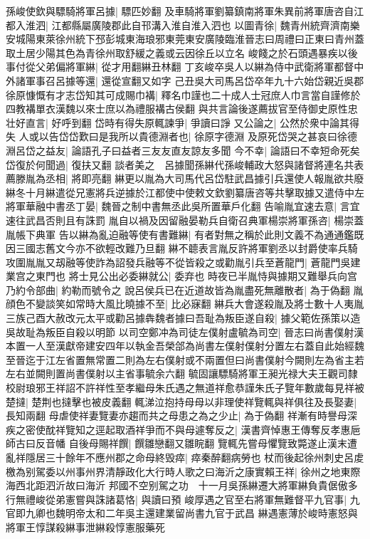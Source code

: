孫峻使欽與驃騎將軍呂據|{
	驃匹妙翻}
及車騎將軍劉纂鎮南將軍朱異前將軍唐咨自江都入淮泗|{
	江都縣屬廣陵郡此自邗溝入淮自淮入泗也}
以圖青徐|{
	魏青州統齊濟南樂安城陽東萊徐州統下邳彭城東海琅邪東莞東安廣陵臨淮晉志曰周禮曰正東曰青州蓋取土居少陽其色為青徐州取舒緩之義或云因徐丘以立名}
峻餞之於石頭遇暴疾以後事付從父弟偏將軍綝|{
	從才用翻綝丑林翻}
丁亥峻卒吳人以綝為侍中武衛將軍都督中外諸軍事召呂據等還|{
	還從宣翻又如字}
己丑吳大司馬呂岱卒年九十六始岱親近吳郡徐原慷慨有才志岱知其可成賜巾褠|{
	釋名巾謹也二十成人士冠庶人巾言當自謹修於四教褠單衣漢魏以來士庶以為禮服褠古侯翻}
與共言論後遂薦拔官至侍御史原性忠壮好直言|{
	好呼到翻}
岱時有得失原輒諫爭|{
	爭讀曰諍}
又公論之|{
	公然於衆中論其得失}
人或以告岱岱歎曰是我所以貴德淵者也|{
	徐原字德淵}
及原死岱哭之甚哀曰徐德淵呂岱之益友|{
	論語孔子曰益者三友友直友諒友多聞}
今不幸|{
	論語曰不幸短命死矣}
岱復於何聞過|{
	復扶又翻}
談者美之　呂據聞孫綝代孫峻輔政大怒與諸督將連名共表薦滕胤為丞相|{
	將即亮翻}
綝更以胤為大司馬代呂岱駐武昌據引兵還使人報胤欲共廢綝冬十月綝遣從兄憲將兵逆據於江都使中使敕文欽劉纂唐咨等共擊取據又遣侍中左將軍華融中書丞丁晏|{
	魏晉之制中書無丞此吳所置華戶化翻}
告喻胤宜速去意|{
	言宜速往武昌否則且有誅罰}
胤自以禍及因留融晏勒兵自衛召典軍楊崇將軍孫咨|{
	楊崇蓋胤帳下典軍}
告以綝為亂迫融等使有書難綝|{
	有者對無之稱於此則文義不為通通鑑既因三國志舊文今亦不欲輕改難乃旦翻}
綝不聼表言胤反許將軍劉丞以封爵使率兵騎攻圍胤胤又刼融等使詐為詔發兵融等不從皆殺之或勸胤引兵至蒼龍門|{
	蒼龍門吳建業宫之東門也}
將士見公出必委綝就公|{
	委弃也}
時夜已半胤恃與據期又難舉兵向宫乃約令部曲|{
	約勒而號令之}
說呂侯兵已在近道故皆為胤盡死無離散者|{
	為于偽翻}
胤顔色不變談笑如常時大風比曉據不至|{
	比必寐翻}
綝兵大會遂殺胤及將士數十人夷胤三族己酉大赦改元太平或勸呂據犇魏者據曰吾耻為叛臣遂自殺|{
	據父範佐孫策以造吳故耻為叛臣自殺以明節}
以司空鄭冲為司徒左僕射盧毓為司空|{
	晉志曰尚書僕射漢本置一人至漢獻帝建安四年以執金吾榮郃為尚書左僕射僕射分置左右蓋自此始經魏至晉迄于江左省置無常置二則為左右僕射或不兩置但曰尚書僕射今闕則左為省主若左右並闕則置尚書僕射以主省事毓余六翻}
毓固讓驃騎將軍王昶光禄大夫王觀司隸校尉琅邪王祥詔不許祥性至孝繼母朱氏遇之無道祥愈恭謹朱氏子覽年數歲每見祥被楚撻|{
	楚荆也撻擊也被皮義翻}
輒涕泣抱持母母以非理使祥覽輒與祥俱往及長娶妻|{
	長知兩翻}
母虐使祥妻覽妻亦趨而共之母患之為之少止|{
	為于偽翻}
祥漸有時譽母深疾之密使酖祥覽知之逕起取酒祥爭而不與母遽奪反之|{
	漢書齊悼惠王傳奪反孝惠巵師古曰反音幡}
自後母賜祥饌|{
	饌雛戀翻又雛睆翻}
覽輒先嘗母懼覽致斃遂止漢末遭亂祥隱居三十餘年不應州郡之命母終毁瘁|{
	瘁秦醉翻病勞也}
杖而後起徐州刺史呂䖍檄為别駕委以州事州界清靜政化大行時人歌之曰海沂之康實賴王祥|{
	徐州之地東際海西北距泗沂故曰海沂}
邦國不空别駕之功　十一月吳孫綝遷大將軍綝負貴倨傲多行無禮峻從弟憲嘗與誅諸葛恪|{
	與讀曰預}
峻厚遇之官至右將軍無難督平九官事|{
	九官即九卿也魏明帝太和二年吳主還建業留尚書九官于武昌}
綝遇憲薄於峻時憲怒與將軍王惇謀殺綝事泄綝殺惇憲服藥死

